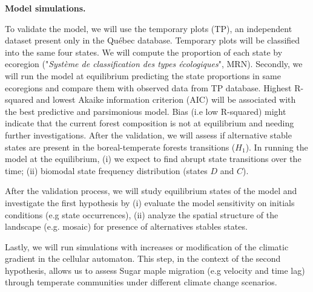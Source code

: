 \textbf{Model simulations.} 

To validate the model, we will use the temporary plots (TP), an independent
dataset present only in the Québec database. Temporary plots will be
classified into the same four states. We will compute the proportion of each
state by ecoregion ("\textit{Système de classification des types
écologiques}", MRN). Secondly, we will run the model at equilibrium predicting
the state proportions in same ecoregions and compare them with observed data
from TP database. Highest R-squared and lowest Akaike information criterion
(AIC) will be associated with the best predictive and parsimonious model. Bias
(i.e low R-squared) might indicate that the current forest composition is not
at equilibrium and needing further investigations. After the validation, we
will assess if alternative stable states are present in the boreal-temperate
forests transitions ($H_1$). In running the model at the equilibrium, (i)  we
expect to find abrupt state transitions over the time; (ii) biomodal state
frequency distribution (states $D$ and $C$).
 

After the validation process, we will study equilibrium states of the model
and investigate the first hypothesis by (i) evaluate the model sensitivity on
initials conditions (e.g state occurrences), (ii) analyze the spatial
structure of the landscape (e.g. mosaic) for presence of alternatives stables
states. 


Lastly, we will run simulations with increases or modification of the
climatic gradient in the cellular automaton. This step, in the context of the
second hypothesis, allows us to assess Sugar maple migration (e.g velocity and
time lag) through  temperate communities under different climate change
scenarios.


\clearpage
\small

